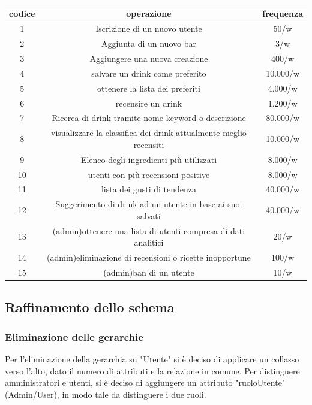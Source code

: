 \documentclass[a4paper,12pt]{report}
\begin{document}
\renewcommand{\arraystretch}{1.7} %
\begin{tabular}{c|c|c} 
    codice & operazione & frequenza\\
\hline
\hline
    1 & Iscrizione di un nuovo utente & 50/w\\
    \hline
    2 & Aggiunta di un nuovo bar & 3/w\\
    \hline
    3 & Aggiungere una nuova creazione & 400/w\\
    \hline
    4 & salvare un drink come preferito & 10.000/w\\
    \hline
    5 & ottenere la lista dei preferiti & 4.000/w\\
    \hline 
    6 & recensire un drink & 1.200/w\\
    \hline
    7 & Ricerca di drink tramite nome keyword o descrizione & 80.000/w\\
    \hline
    8 & visualizzare la classifica dei drink attualmente meglio recensiti & 10.000/w\\
    \hline
    9 & Elenco degli ingredienti più utilizzati & 8.000/w\\
    \hline
    10 & utenti con più recensioni positive & 8.000/w\\
    \hline
    11 & lista dei gusti di tendenza & 40.000/w\\
    \hline
    12 & Suggerimento di drink ad un utente in base ai suoi salvati & 40.000/w\\
    \hline
    13 & \small(admin)\normalsize ottenere una lista di utenti compresa di dati analitici & 20/w\\
    \hline
    14 & \small(admin)\normalsize eliminazione di recensioni o ricette inopportune & 100/w\\
    \hline
    15 & \small(admin)\normalsize ban di un utente & 10/w\\    
\hline
\end{tabular}

\newpage
\subsection{Raffinamento dello schema}
\label{raffinamentoSchema}
\subsubsection{Eliminazione delle gerarchie}
Per l'eliminazione della gerarchia su "Utente" si è deciso di applicare un collasso verso l'alto, dato il numero di attributi e la relazione in comune. Per distinguere amministratori e utenti, si è deciso di aggiungere un attributo "ruoloUtente" (Admin/User), in modo tale da distinguere i due ruoli.
\end{document}
